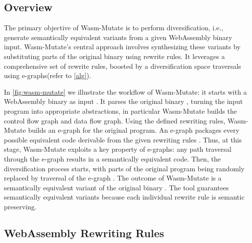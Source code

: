 \documentclass[a4paper,fleqn]{cas-dc}
\newcommand*\badge[1]{ \colorbox{red}{\color{white}#1}}
\newcommand{\tool}{{\sc Wasm-Mutate}\xspace}
\newcommand*\step[1]{
\noindent\tikz[baseline=(char.base)]{
        \node[shape=circle,text=black,draw=black, fill=white,inner sep=1.2pt] (char) {#1};}}
\newcommand{\todo}[1]{%
\refstepcounter{todo}
\noindent\textbf{\badge{TODO}} {\color{red}#1}
\addcontentsline{td}{todo}
{\color{red}\thesection.\thetodo\xspace #1}}
\begin{document}
\subsection{Overview}
The primary objective of \tool is to perform diversification, i.e., generate semantically equivalent variants from a given WebAssembly binary input. 
\tool's central approach involves synthesizing these variants by substituting parts of the original binary using rewrite rules. 
It leverages a comprehensive set of rewrite rules, boosted by a diversification space traversals using e-graphs(refer to \autoref{alg}).


In \autoref{fig:wasm-mutate} we illustrate the workflow of \tool: it starts with a WebAssembly binary as input \step{1}.
It parses the original binary \step{2}, turning the input program into appropriate abstractions, in particular \tool builds the control flow graph and data flow graph. 
Using the defined rewriting rules, \tool builds an e-graph \step{3} for the original program.
An e-graph packages every possible equivalent code derivable from the given rewriting rules  \cite{10.1145/3434304, 10.1145/3385412.3386001}.
Thus, at this stage, \tool exploits a key property of e-graphs:
any path traversal through the e-graph results in a semantically equivalent code.
Then, the diversification process starts, with parts of the original program being randomly replaced by traversal of the e-graph \step{4}.
The outcome of \tool is a semantically equivalent variant of the original binary \step{5}.
The tool guarantees semantically equivalent variants because each individual rewrite rule is semantic preserving.






\subsection{WebAssembly Rewriting Rules}
\end{document}
